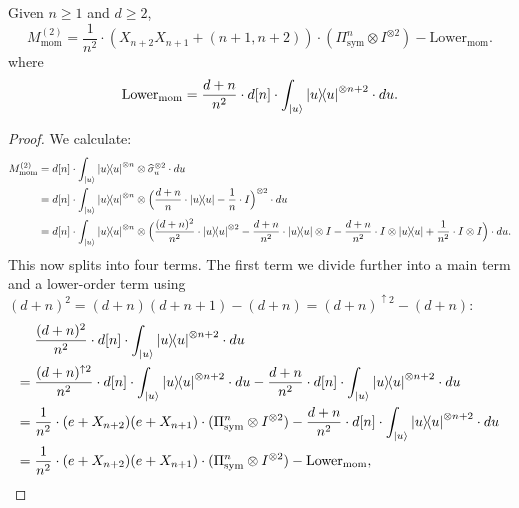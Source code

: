 \documentclass{article}
\begin{document}
\begin{lemma}\label{lem:second-moment-operator}
    Given $n \geq 1$ and $d \geq 2$,
    \begin{equation*}
        M_{\mathrm{mom}}^{(2)} = \frac{1}{n^2} \cdot (X_{n+2}X_{n+1} + (n+1, n+2)) \cdot (\Pi_{\mathrm{sym}}^n \otimes I^{\otimes 2}) - \mathrm{Lower}_{\mathrm{mom}}.
    \end{equation*}
    where
    \begin{equation*}
        \mathrm{Lower}_{\mathrm{mom}} = \frac{d+n}{n^2} \cdot d[n] \cdot \int_{\ket{u}} \ketbra{u}^{\otimes n + 2} \cdot du.
    \end{equation*}
\end{lemma}
\begin{proof}
    We calculate:
    \begin{align*}
        M_{\mathrm{mom}}^{(2)}
        & = d[n] \cdot \int_{\ket{u}} \ketbra{u}^{\otimes n} \otimes \widehat{\sigma}_{u}^{\otimes 2} \cdot du\\
        & = d[n] \cdot \int_{\ket{u}} \ketbra{u}^{\otimes n} \otimes \Big(\frac{d+n}{n} \cdot \ketbra{u} - \frac{1}{n} \cdot I\Big)^{\otimes 2} \cdot du\\
        & = d[n] \cdot \int_{\ket{u}} \ketbra{u}^{\otimes n} \otimes \Big(\frac{(d+n)^2}{n^2} \cdot \ketbra{u}^{\otimes 2} - \frac{d+n}{n^2}\cdot \ketbra{u} \otimes I - \frac{d+n}{n^2}\cdot I \otimes \ketbra{u} + \frac{1}{n^2} \cdot I \otimes I\Big) \cdot du.
    \end{align*}
    This now splits into four terms. The first term we divide further into a main term and a lower-order term using $(d+n)^2 = (d+n)(d+n+1) - (d+n) = (d+n)^{\uparrow 2}- (d+n)$:
    \begin{align*}
        &\frac{(d+n)^2}{n^2} \cdot d[n] \cdot \int_{\ket{u}} \ketbra{u}^{\otimes n + 2} \cdot du
        \\={}& \frac{(d+n)^{\uparrow 2}}{n^2} \cdot d[n] \cdot \int_{\ket{u}} \ketbra{u}^{\otimes n + 2} \cdot du - \frac{d+n}{n^2} \cdot d[n] \cdot \int_{\ket{u}} \ketbra{u}^{\otimes n + 2} \cdot du
        \\={}& \frac{1}{n^2} \cdot (e+X_{n+2})(e+X_{n+1}) \cdot (\Pi_{\mathrm{sym}}^n \otimes I^{\otimes 2}) - \frac{d+n}{n^2} \cdot d[n] \cdot \int_{\ket{u}} \ketbra{u}^{\otimes n + 2} \cdot du\\={}&  \frac{1}{n^2} \cdot(e+X_{n+2})(e+X_{n+1}) \cdot (\Pi_{\mathrm{sym}}^n \otimes I^{\otimes 2}) - \mathrm{Lower}_{\mathrm{mom}},
    \end{align*}

\end{proof}
\end{document}
